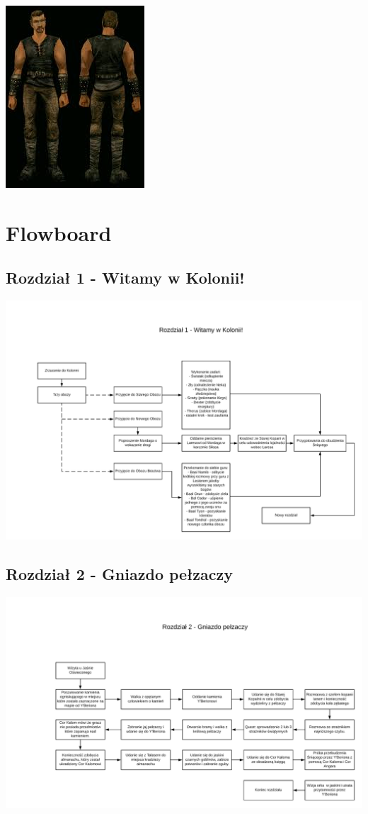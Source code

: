 \documentclass[11pt,polish, openany]{book}
\begin{document}
\begin{center}
\includegraphics[scale=2]{bezimiennybody2}
\end{center}
\chapter{Flowboard}
\section{Rozdział 1 - Witamy w Kolonii!}
\begin{center}
\includegraphics[scale=0.13, angle=90]{rozdzial1}
\end{center}
\section{Rozdział 2 - Gniazdo pełzaczy}
\begin{center}
\includegraphics[scale=0.17, angle=90]{rozdzial2}
\end{center}
\end{document}
